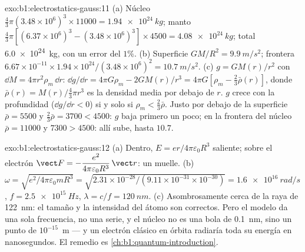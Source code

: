 \begin{solution}{exo:b1:electrostatics-gauss:11}
(a) Núcleo $\tfrac43\pi(3.48 \times 10^6)^3 \times 11000 = \qty{1.94e24}{kg}$; manto
$\tfrac43\pi[(6.37 \times 10^6)^3 - (3.48 \times 10^6)^3] \times 4500 = \qty{4.08e24}{kg}$;
total \qty{6.0e24}{kg}, con un error del $1\%$. (b) Superficie $GM/R^2 = \qty{9.9}{m/s^2}$;
frontera $6.67 \times 10^{-11} \times 1.94 \times 10^{24}/(3.48 \times 10^6)^2 =
\qty{10.7}{m/s^2}$. (c) $g = GM(r)/r^2$ con $\dd M = 4\pi r^2\rho_m\,\dd r$:
$\dd g/\dd r = 4\pi G\rho_m - 2GM(r)/r^3 = 4\pi G[\rho_m - \tfrac23\bar\rho(r)]$,
donde $\bar\rho(r) = M(r)/\tfrac43\pi r^3$ es la densidad media por debajo de $r$.
$g$ crece con la profundidad ($\dd g/\dd r < 0$) si y solo si $\rho_m < \tfrac23\bar\rho$. Justo
por debajo de la superficie $\bar\rho = 5500$ y $\tfrac23\bar\rho = 3700 < 4500$: $g$
baja primero un poco; en la frontera del núcleo $\bar\rho = 11000$ y $7300 >
4500$: allí sube, hasta $10.7$.
\end{solution}

\begin{solution}{exo:b1:electrostatics-gauss:12}
(a) Dentro, $E = er/4\pi\varepsilon_0R^3$ saliente; sobre el electrón $\vect F =
-\dfrac{e^2}{4\pi\varepsilon_0R^3}\,\vect r$: un muelle. (b) $\omega = \sqrt{e^2/4\pi\varepsilon_0mR^3}
= \sqrt{2.31 \times 10^{-28}/(9.11 \times 10^{-31} \times 10^{-30})} = \qty{1.6e16}{rad/s}$,
$f = \qty{2.5e15}{Hz}$, $\lambda = c/f = \qty{120}{nm}$. (c) Asombrosamente
cerca de la raya de \qty{122}{nm}: el tamaño y la intensidad del átomo son
correctos. Pero el modelo da una sola frecuencia, no una serie, y el
núcleo no es una bola de \qty{0.1}{nm}, sino un punto de $10^{-15}$~m --- y
un electrón clásico en órbita radiaría toda su energía en nanosegundos.
El remedio es \cref{ch:b1:quantum-introduction}.
\end{solution}

